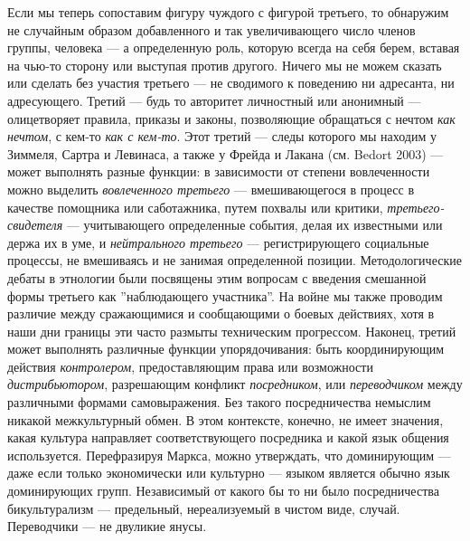 \documentclass[12pt]{book}
\begin{document}
Если мы теперь сопоставим фигуру чуждого с фигурой третьего, то обнаружим не случайным образом добавленного и так увеличивающего число членов группы, человека --- а определенную роль, которую всегда на себя берем, вставая на чью-то сторону или выступая против другого. Ничего мы не можем сказать или сделать без участия третьего --- не сводимого к поведению ни адресанта, ни адресующего. Третий --- будь то авторитет личностный или анонимный --- олицетворяет правила, приказы и законы, позволяющие обращаться с нечтом \textit{как нечтом}, с кем-то \textit{как с кем-то}. Этот третий --- следы которого мы находим у Зиммеля, Сартра и Левинаса, а также у Фрейда и Лакана (см. Bedort 2003) --- может выполнять разные функции: в зависимости от степени вовлеченности можно выделить \textit{вовлеченного третьего} --- вмешивающегося в процесс в качестве помощника или саботажника, путем похвалы или критики, \textit{третьего-свидетеля} --- учитывающего определенные события, делая их известными или держа их в уме, и \textit{нейтрального третьего} --- регистрирующего социальные процессы, не вмешиваясь и не занимая определенной позиции. Методологические дебаты в этнологии были посвящены этим вопросам с введения смешанной формы третьего как ''наблюдающего участника''. На войне мы также проводим различие между сражающимися и сообщающими о боевых действиях, хотя в наши дни границы эти часто размыты техническим прогрессом. Наконец, третий может выполнять различные функции упорядочивания: быть координирующим действия \textit{контролером}, предоставляющим права или возможности \textit{дистрибьютором}, разрешающим конфликт \textit{посредником}, или \textit{переводчиком} между различными формами самовыражения. Без такого посредничества немыслим никакой межкультурный обмен. В этом контексте, конечно, не имеет значения, какая культура направляет соответствующего посредника и какой язык общения используется. Перефразируя Маркса, можно утверждать, что доминирующим --- даже если только экономически или культурно --- языком является обычно язык доминирующих групп. Независимый от какого бы то ни было посредничества бикультурализм --- предельный, нереализуемый в чистом виде, случай. Переводчики --- не двуликие янусы.
\end{document}
